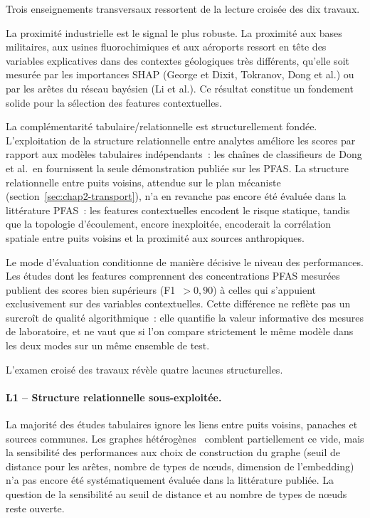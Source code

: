 \label{sec:chap2-convergences}

Trois enseignements transversaux ressortent de la lecture crois\'ee des dix travaux.

La proximit\'e industrielle est le signal le plus robuste.
La proximit\'e aux bases militaires, aux usines fluorochimiques et aux a\'eroports ressort en t\^ete des variables explicatives dans des contextes g\'eologiques tr\`es diff\'erents, qu'elle soit mesur\'ee par les importances SHAP (George et Dixit, Tokranov, Dong et al.) ou par les ar\^etes du r\'eseau bay\'esien (Li et al.).
Ce r\'esultat constitue un fondement solide pour la s\'election des features contextuelles.

La compl\'ementarit\'e tabulaire/relationnelle est structurellement fond\'ee.
L'exploitation de la structure relationnelle entre analytes am\'eliore les scores par rapport aux mod\`eles tabulaires ind\'ependants~: les cha\^ines de classifieurs de Dong et al.\ en fournissent la seule d\'emonstration publi\'ee sur les PFAS.
La structure relationnelle entre puits voisins, attendue sur le plan m\'ecaniste (section~\ref{sec:chap2-transport}), n'a en revanche pas encore \'et\'e \'evalu\'ee dans la litt\'erature PFAS~: les features contextuelles encodent le risque statique, tandis que la topologie d'\'ecoulement, encore inexploit\'ee, encoderait la corr\'elation spatiale entre puits voisins et la proximit\'e aux sources anthropiques.

Le mode d'\'evaluation conditionne de mani\`ere d\'ecisive le niveau des performances.
Les \'etudes dont les features comprennent des concentrations PFAS mesur\'ees publient des scores bien sup\'erieurs (F1~$> 0{,}90$) \`a celles qui s'appuient exclusivement sur des variables contextuelles.
Cette diff\'erence ne refl\`ete pas un surcro\^it de qualit\'e algorithmique~: elle quantifie la valeur informative des mesures de laboratoire, et ne vaut que si l'on compare strictement le m\^eme mod\`ele dans les deux modes sur un m\^eme ensemble de test.


\label{sec:chap2-lacunes}

L'examen crois\'e des travaux r\'ev\`ele quatre lacunes structurelles.

\paragraph{L1 -- Structure relationnelle sous-exploit\'ee.}
La majorit\'e des \'etudes tabulaires ignore les liens entre puits voisins, panaches et sources communes.
Les graphes h\'et\'erog\`enes~\cite{hu2020hgt} comblent partiellement ce vide, mais la sensibilit\'e des performances aux choix de construction du graphe (seuil de distance pour les ar\^etes, nombre de types de n\oe uds, dimension de l'embedding) n'a pas encore \'et\'e syst\'ematiquement \'evalu\'ee dans la litt\'erature publi\'ee.
La question de la sensibilit\'e au seuil de distance et au nombre de types de n\oe uds reste ouverte.

